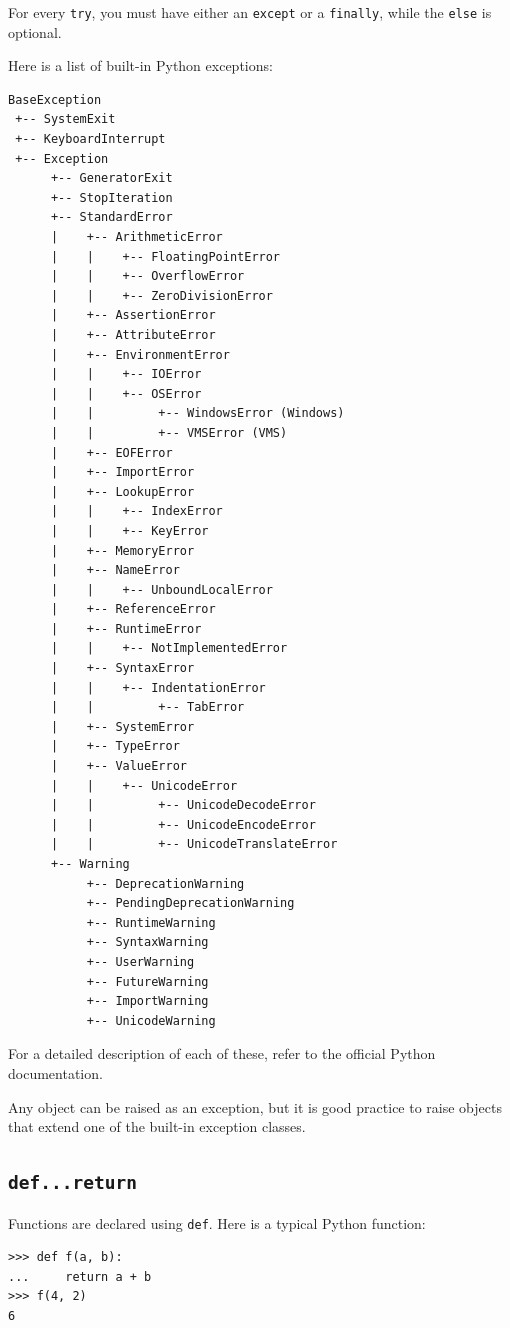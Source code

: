 \documentclass[justified, sixbynine]{tufte-book}
\def\ft{\small\tt}
\theoremstyle{plain}%
\newtheorem * {corollary}{Corollary}
\theoremstyle{definition}
\theoremstyle{remark}
\newtheorem * {remark}{Remark}
\newtheorem * {note}{Note}
\begin{document}
\begin{fullwidth}
For every {\ft try}, you must have either an {\ft except} or a {\ft finally}, while the {\ft else} is optional.

Here is a list of built-in Python exceptions:
\begin{lstlisting}
BaseException
 +-- SystemExit
 +-- KeyboardInterrupt
 +-- Exception
      +-- GeneratorExit
      +-- StopIteration
      +-- StandardError
      |    +-- ArithmeticError
      |    |    +-- FloatingPointError
      |    |    +-- OverflowError
      |    |    +-- ZeroDivisionError
      |    +-- AssertionError
      |    +-- AttributeError
      |    +-- EnvironmentError
      |    |    +-- IOError
      |    |    +-- OSError
      |    |         +-- WindowsError (Windows)
      |    |         +-- VMSError (VMS)
      |    +-- EOFError
      |    +-- ImportError
      |    +-- LookupError
      |    |    +-- IndexError
      |    |    +-- KeyError
      |    +-- MemoryError
      |    +-- NameError
      |    |    +-- UnboundLocalError
      |    +-- ReferenceError
      |    +-- RuntimeError
      |    |    +-- NotImplementedError
      |    +-- SyntaxError
      |    |    +-- IndentationError
      |    |         +-- TabError
      |    +-- SystemError
      |    +-- TypeError
      |    +-- ValueError
      |    |    +-- UnicodeError
      |    |         +-- UnicodeDecodeError
      |    |         +-- UnicodeEncodeError
      |    |         +-- UnicodeTranslateError
      +-- Warning
           +-- DeprecationWarning
           +-- PendingDeprecationWarning
           +-- RuntimeWarning
           +-- SyntaxWarning
           +-- UserWarning
           +-- FutureWarning
           +-- ImportWarning
           +-- UnicodeWarning
\end{lstlisting}

For a detailed description of each of these, refer to the official Python documentation.

Any object can be raised as an exception, but it is good practice to raise objects that extend one of the built-in exception classes.

\goodbreak\subsection{{\ft def...return}}

 

Functions are declared using {\ft def}.  Here is a typical Python function:
\begin{lstlisting}
>>> def f(a, b):
...     return a + b
>>> f(4, 2)
6
\end{lstlisting}


\end{fullwidth}
\end{document}
